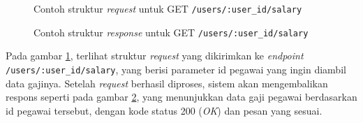 \begin{figure}
    \centering
    \caption{Contoh struktur \textit{request} untuk GET \texttt{/users/{:user\_id}/salary}}
    \label{fig:request_users_salary_by_user_id_get}
\end{figure}
\begin{figure}
    \centering
    \caption{Contoh struktur \textit{response} untuk GET \texttt{/users/{:user\_id}/salary}}
    \label{fig:response_users_salary_by_user_id_get}
\end{figure}

Pada gambar \ref{fig:request_users_salary_by_user_id_get}, terlihat struktur \textit{request} yang dikirimkan ke \textit{endpoint} \texttt{/users/{:user\_id}/salary}, yang berisi parameter id pegawai yang ingin diambil data gajinya. Setelah \textit{request} berhasil diproses, sistem akan mengembalikan respons seperti pada gambar \ref{fig:response_users_salary_by_user_id_get}, yang menunjukkan data gaji pegawai berdasarkan id pegawai tersebut, dengan kode status 200 (\textit{OK}) dan pesan yang sesuai.

